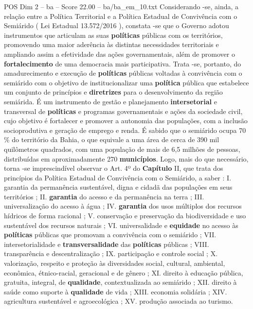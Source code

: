 \begin{textsample}{POS Dim 2 – ba – Score 22.00 – ba/ba\_em\_10.txt}
Considerando -se, ainda, a relação entre a Política Territorial e a Política Estadual de Convivência com o Semiárido ( Lei Estadual 13.572/2016 ), constata -se que o Governo adotou instrumentos que articulam as suas \textbf{políticas} públicas com os territórios, promovendo uma maior aderência às distintas necessidades territoriais e ampliando assim a efetividade das ações governamentais, além de promover o \textbf{fortalecimento} de uma democracia mais participativa.
Trata -se, portanto, do amadurecimento e execução de \textbf{políticas} públicas voltadas à convivência com o semiárido com o objetivo de institucionalizar uma \textbf{política} pública que estabelece um conjunto de princípios e \textbf{diretrizes} para o desenvolvimento da região semiárida.
É um instrumento de gestão e planejamento \textbf{intersetorial} e transversal de \textbf{políticas} e programas governamentais e ações da sociedade civil, cujo objetivo é fortalecer e promover a autonomia das populações, com a inclusão socioprodutiva e geração de emprego e renda.
É sabido que o semiárido ocupa 70 \% do território da Bahia, o que equivale a uma área de cerca de 390 mil quilômetros quadrados, com uma população de mais de 6,5 milhões de pessoas, distribuídas em aproximadamente 270 \textbf{municípios}.
Logo, mais do que necessário, torna -se imprescindível observar o Art. 4º do \textbf{Capítulo} II, que trata dos princípios da Política Estadual de Convivência com o Semiárido, a saber : I. garantia da permanência sustentável, digna e cidadã das populações em seus territórios ; II. \textbf{garantia} do acesso e da permanência na terra ; III. universalização do acesso à água ; IV. \textbf{garantia} dos usos múltiplos dos recursos hídricos de forma racional ; V. conservação e preservação da biodiversidade e uso sustentável dos recursos naturais ; VI. universalidade e \textbf{equidade} no acesso às \textbf{políticas} públicas que promovam a convivência com o semiárido ; VII. intersetorialidade e \textbf{transversalidade} das \textbf{políticas} públicas ; VIII. transparência e descentralização ; IX. participação e controle social ; X. valorização, respeito e proteção às diversidades social, cultural, ambiental, econômica, étnico-racial, geracional e de gênero ; XI. direito à educação pública, gratuita, integral, de \textbf{qualidade}, contextualizada ao semiárido ; XII. direito à saúde como suporte à \textbf{qualidade} de vida ; XIII. economia solidária ; XIV. agricultura sustentável e agroecológica ; XV. produção associada ao turismo.

\end{textsample}
